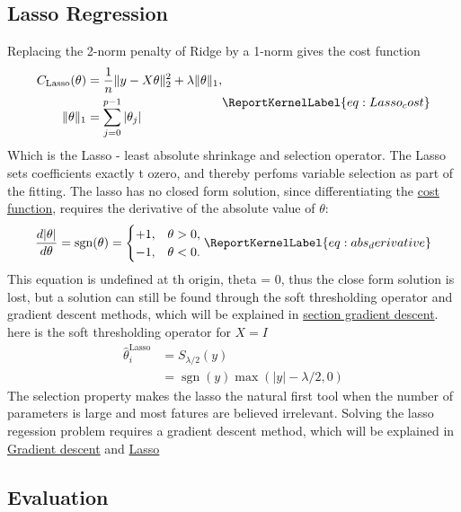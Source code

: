 \documentclass[aps,rmp,reprint,raggedbottom,amsmath,amssymb,longbibliography]{revtex4-1}
\let\label\ReportKernelLabel
\begin{document}
\subsection{Lasso Regression}
Replacing the 2-norm penalty of Ridge by a 1-norm gives the cost function
\begin{equation}
  \begin{aligned}
  C_{\mathrm{Lasso}}(\theta)
  &= \frac{1}{n}\lVert y - X\theta\rVert_2^2 + \lambda\lVert\theta\rVert_1, \\
  \lVert\theta\rVert_1 &= \sum_{j=0}^{p-1}|\theta_j|
  \end{aligned}
\label{eq:Lasso_cost}
\end{equation}
Which is the Lasso - least absolute shrinkage and selection operator. The Lasso
sets coefficients exactly t ozero, and thereby perfoms variable selection as part of the fitting. \cite[p.~90]{LectureNotes}
The lasso has no closed form solution, since differentiating the \hyperref[eq:Lasso_cost]{cost function},
requires the derivative of the absolute value of $\theta$:
 \begin{equation}
\frac{d|\theta|}{d\theta}
= \operatorname{sgn}(\theta)
= \begin{cases}
+1, & \theta > 0, \\
-1, & \theta < 0.
\end{cases}
\label{eq:abs_derivative}
\end{equation}
This equation is undefined at th origin, theta = 0, thus the close form solution is lost,
but a solution can still be found through the soft thresholding operator and gradient descent methods,
which will be explained in \hyperref[sec:GD]{section gradient descent}.
here is the soft thresholding operator for $X=I$
\begin{equation}
  \begin{aligned}
  \hat{\theta}_i^{\mathrm{Lasso}} &= S_{\lambda/2}(y) \\
  &= \operatorname{sgn}(y)\max(|y| - \lambda/2, 0)
  \end{aligned}
\end{equation}
\cite[p.~91]{LectureNotes}
The selection property makes the lasso the natural first tool when the
number of parameters is large and most fatures are believed irrelevant.
Solving the lasso regession problem requires a gradient descent method, 
which will be explained in \hyperref[sec:GD]{Gradient descent} and 
\hyperref[subsec:Lasso_GD]{Lasso}

\subsection{Evaluation}
\end{document}
